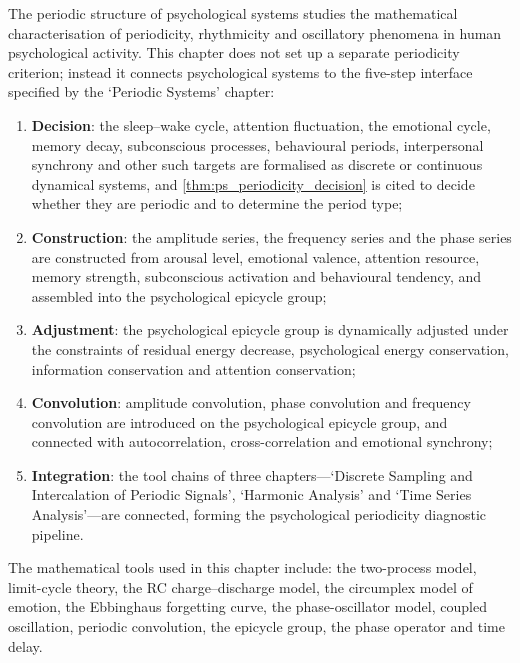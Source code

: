 \begin{remark}\label{rem:psych_five_steps_positioning}
The periodic structure of psychological systems studies the mathematical characterisation of periodicity, rhythmicity and oscillatory phenomena in human psychological activity. This chapter does not set up a separate periodicity criterion; instead it connects psychological systems to the five-step interface specified by the `Periodic Systems' chapter:
\begin{enumerate}[label=(\arabic*)]
    \item \textbf{Decision}: the sleep--wake cycle, attention fluctuation, the emotional cycle, memory decay, subconscious processes, behavioural periods, interpersonal synchrony and other such targets are formalised as discrete or continuous dynamical systems, and \cref{thm:ps_periodicity_decision} is cited to decide whether they are periodic and to determine the period type;
    \item \textbf{Construction}: the amplitude series, the frequency series and the phase series are constructed from arousal level, emotional valence, attention resource, memory strength, subconscious activation and behavioural tendency, and assembled into the psychological epicycle group;
    \item \textbf{Adjustment}: the psychological epicycle group is dynamically adjusted under the constraints of residual energy decrease, psychological energy conservation, information conservation and attention conservation;
    \item \textbf{Convolution}: amplitude convolution, phase convolution and frequency convolution are introduced on the psychological epicycle group, and connected with autocorrelation, cross-correlation and emotional synchrony;
    \item \textbf{Integration}: the tool chains of three chapters---`Discrete Sampling and Intercalation of Periodic Signals', `Harmonic Analysis' and `Time Series Analysis'---are connected, forming the psychological periodicity diagnostic pipeline.
\end{enumerate}
The mathematical tools used in this chapter include: the two-process model, limit-cycle theory, the RC charge--discharge model, the circumplex model of emotion, the Ebbinghaus forgetting curve, the phase-oscillator model, coupled oscillation, periodic convolution, the epicycle group, the phase operator and time delay.
\end{remark}

